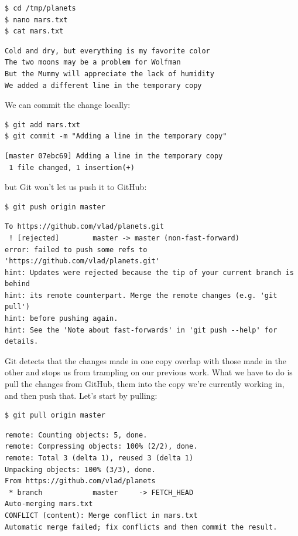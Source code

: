 \documentclass{book}
\begin{document}
\begin{verbatim}
$ cd /tmp/planets
$ nano mars.txt
$ cat mars.txt
\end{verbatim}

\begin{verbatim}
Cold and dry, but everything is my favorite color
The two moons may be a problem for Wolfman
But the Mummy will appreciate the lack of humidity
We added a different line in the temporary copy
\end{verbatim}

We can commit the change locally:

\begin{verbatim}
$ git add mars.txt
$ git commit -m "Adding a line in the temporary copy"
\end{verbatim}

\begin{verbatim}
[master 07ebc69] Adding a line in the temporary copy
 1 file changed, 1 insertion(+)
\end{verbatim}

but Git won't let us push it to GitHub:

\begin{verbatim}
$ git push origin master
\end{verbatim}

\begin{verbatim}
To https://github.com/vlad/planets.git
 ! [rejected]        master -> master (non-fast-forward)
error: failed to push some refs to 'https://github.com/vlad/planets.git'
hint: Updates were rejected because the tip of your current branch is behind
hint: its remote counterpart. Merge the remote changes (e.g. 'git pull')
hint: before pushing again.
hint: See the 'Note about fast-forwards' in 'git push --help' for details.
\end{verbatim}

Git detects that the changes made in one copy overlap with those made in
the other and stops us from trampling on our previous work. What we have
to do is pull the changes from GitHub,
 them into the copy we're currently
working in, and then push that. Let's start by pulling:

\begin{verbatim}
$ git pull origin master
\end{verbatim}

\begin{verbatim}
remote: Counting objects: 5, done.
remote: Compressing objects: 100% (2/2), done.
remote: Total 3 (delta 1), reused 3 (delta 1)
Unpacking objects: 100% (3/3), done.
From https://github.com/vlad/planets
 * branch            master     -> FETCH_HEAD
Auto-merging mars.txt
CONFLICT (content): Merge conflict in mars.txt
Automatic merge failed; fix conflicts and then commit the result.
\end{verbatim}
\end{document}
